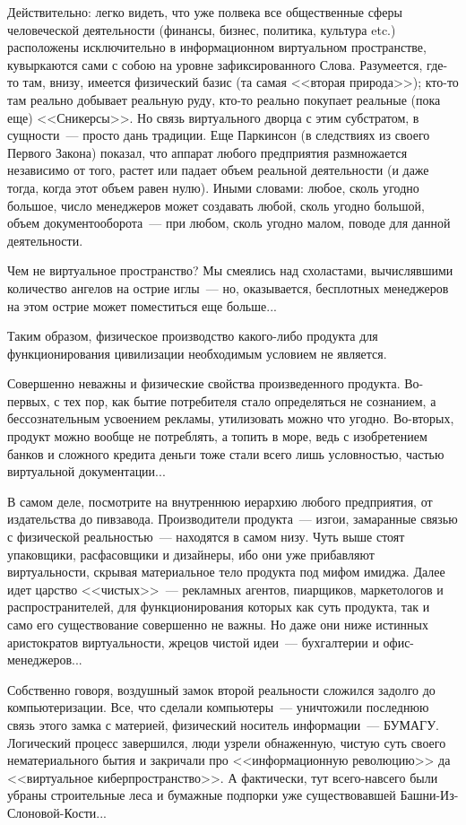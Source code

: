 \documentclass{scrbook}
\newcommand{\flqq}{<<}
\newcommand{\frqq}{>>}
\newcommand{\mdash}{~--- }
\begin{document}
Действительно: легко видеть, что уже полвека все общественные сферы человеческой деятельности (финансы, бизнес, политика, культура etc.) расположены исключительно в информационном виртуальном пространстве, кувыркаются сами с собою на уровне зафиксированного Слова. Разумеется, где-то там, внизу, имеется физический базис (та самая {\flqq}вторая природа{\frqq}); кто-то там реально добывает реальную руду, кто-то реально покупает реальные (пока еще) {\flqq}Сникерсы{\frqq}. Но связь виртуального дворца с этим субстратом, в сущности{\mdash}просто дань традиции. Еще Паркинсон (в следствиях из своего Первого Закона) показал, что аппарат любого предприятия размножается независимо от того, растет или падает объем реальной деятельности (и даже тогда, когда этот объем равен нулю). Иными словами: любое, сколь угодно большое, число менеджеров может создавать любой, сколь угодно большой, объем документооборота{\mdash}при любом, сколь угодно малом, поводе для данной деятельности.

Чем не виртуальное пространство? Мы смеялись над схоластами, вычислявшими количество ангелов на острие иглы{\mdash}но, оказывается, бесплотных менеджеров на этом острие может поместиться еще больше...

Таким образом, физическое производство какого-либо продукта для функционирования цивилизации необходимым условием не является.

Совершенно неважны и физические свойства произведенного продукта. Во-первых, с тех пор, как бытие потребителя стало определяться не сознанием, а бессознательным усвоением рекламы, утилизовать можно что угодно. Во-вторых, продукт можно вообще не потреблять, а топить в море, ведь с изобретением банков и сложного кредита деньги тоже стали всего лишь условностью, частью виртуальной документации...

В самом деле, посмотрите на внутреннюю иерархию любого предприятия, от издательства до пивзавода. Производители продукта{\mdash}изгои, замаранные связью с физической реальностью{\mdash}находятся в самом низу. Чуть выше стоят упаковщики, расфасовщики и дизайнеры, ибо они уже прибавляют виртуальности, скрывая материальное тело продукта под мифом имиджа. Далее идет царство {\flqq}чистых{\frqq}{\mdash}рекламных агентов, пиарщиков, маркетологов и распространителей, для функционирования которых как суть продукта, так и само его существование совершенно не важны. Но даже они ниже истинных аристократов виртуальности, жрецов чистой идеи{\mdash}бухгалтерии и офис-менеджеров...

Собственно говоря, воздушный замок второй реальности сложился задолго до компьютеризации. Все, что сделали компьютеры{\mdash}уничтожили последнюю связь этого замка с материей, физический носитель информации{\mdash}БУМАГУ. Логический процесс завершился, люди узрели обнаженную, чистую суть своего нематериального бытия и закричали про {\flqq}информационную революцию{\frqq} да {\flqq}виртуальное киберпространство{\frqq}. А фактически, тут всего-навсего были убраны строительные леса и бумажные подпорки уже существовавшей Башни-Из-Слоновой-Кости...
\end{document}
